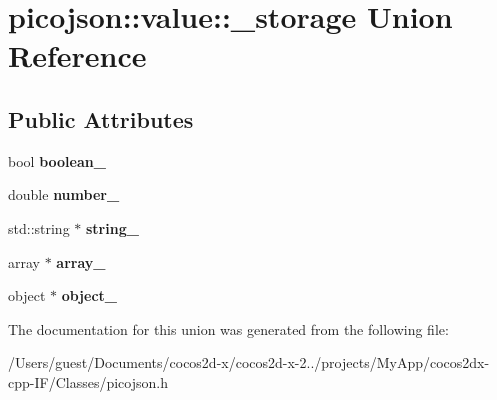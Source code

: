 \hypertarget{unionpicojson_1_1value_1_1__storage}{\section{picojson\-:\-:value\-:\-:\-\_\-storage Union Reference}
\label{unionpicojson_1_1value_1_1__storage}
}
\subsection*{Public Attributes}
\begin{DoxyCompactItemize}
\item 
\hypertarget{unionpicojson_1_1value_1_1__storage_a612a1a8ceb65bdd2e8f09eb33074ba0b}{bool {\bfseries boolean\-\_\-}}\label{unionpicojson_1_1value_1_1__storage_a612a1a8ceb65bdd2e8f09eb33074ba0b}

\item 
\hypertarget{unionpicojson_1_1value_1_1__storage_a4fc799f222c28156f943a891e510e438}{double {\bfseries number\-\_\-}}\label{unionpicojson_1_1value_1_1__storage_a4fc799f222c28156f943a891e510e438}

\item 
\hypertarget{unionpicojson_1_1value_1_1__storage_a9ec5aa5b86bbef81b15697c936f58736}{std\-::string $\ast$ {\bfseries string\-\_\-}}\label{unionpicojson_1_1value_1_1__storage_a9ec5aa5b86bbef81b15697c936f58736}

\item 
\hypertarget{unionpicojson_1_1value_1_1__storage_aeac6ef9328845f1f6402c35bb281990a}{array $\ast$ {\bfseries array\-\_\-}}\label{unionpicojson_1_1value_1_1__storage_aeac6ef9328845f1f6402c35bb281990a}

\item 
\hypertarget{unionpicojson_1_1value_1_1__storage_ad1feb283e78999609c7a27be95e5f4df}{object $\ast$ {\bfseries object\-\_\-}}\label{unionpicojson_1_1value_1_1__storage_ad1feb283e78999609c7a27be95e5f4df}

\end{DoxyCompactItemize}


The documentation for this union was generated from the following file\-:\begin{DoxyCompactItemize}
\item 
/\-Users/guest/\-Documents/cocos2d-\/x/cocos2d-\/x-\/2../projects/\-My\-App/cocos2dx-\/cpp-\/\-I\-F/\-Classes/picojson.\-h\end{DoxyCompactItemize}
